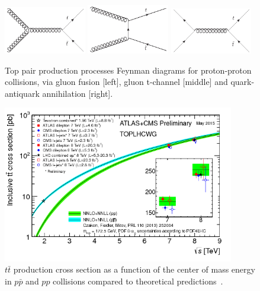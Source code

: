 \begin{figure}[!Hhtbp]
  \begin{center}
    \includegraphics[width=0.32\textwidth]{figs/Gluon_fusion_top_pair.jpg}
    \includegraphics[width=0.32\textwidth]{figs/Gluon_tchannel_top_pair.jpg}
    \includegraphics[width=0.32\textwidth]{figs/Quarks_schannel_top_pair.jpg}
    \caption{Top pair production processes Feynman diagrams for proton-proton collisions, via gluon fusion [left], gluon t-channel [middle] and quark-antiquark annihilation [right].}
    \label{fig:PairProductionFD}
  \end{center}
\end{figure}

\begin{figure}[!Hhtbp]
  \begin{center}
    \includegraphics[width=0.9\textwidth]{figs/toplhcwg_ttxsec_sqrts_may2015.png}
    \caption{$t\bar{t}$ production cross section as a function of the center of mass energy in $p\bar{p}$ and $pp$ collisions compared to theoretical predictions~\cite{TOPLHCWG}.}
    \label{fig:PairProduction}
  \end{center}
\end{figure}

